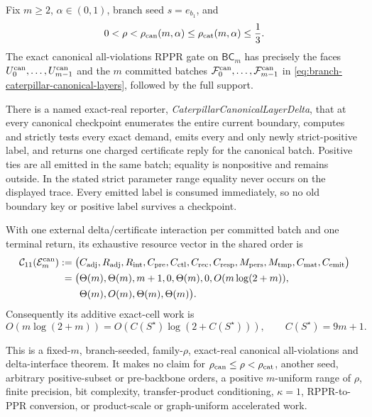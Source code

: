 \begin{theorem}
\label{thm:branch-caterpillar-canonical-layer-reporter}
Fix $m\geq2$, $\alpha\in(0,1)$, branch seed $s=e_{b_1}$, and
\begin{equation*}
 0<\rho<\rho_{\rm can}(m,\alpha)
 \leq\rho_{\rm cat}(m,\alpha)\leq\frac13.
\end{equation*}
The exact canonical all-violations RPPR gate on $\mathsf{BC}_m$ has precisely
the faces $U_0^{\rm can},\ldots,U_{m-1}^{\rm can}$ and the $m$ committed
batches $\mathcal F_0^{\rm can},\ldots,\mathcal F_{m-1}^{\rm can}$ in
\eqref{eq:branch-caterpillar-canonical-layers}, followed by the full support.

There is a named exact-real reporter,
\emph{CaterpillarCanonicalLayerDelta}, that at every canonical checkpoint
enumerates the entire current boundary, computes and strictly tests every
exact demand, emits every and only newly strict-positive label, and returns
one charged certificate reply for the canonical batch.  Positive ties are
all emitted in the same batch; equality is nonpositive and remains outside.
In the stated strict parameter range equality never occurs on the displayed
trace.  Every emitted label is consumed immediately, so no old boundary key
or positive label survives a checkpoint.

With one external delta/certificate interaction per committed batch and one
terminal return, its exhaustive resource vector in the shared order is
\begin{equation}
 \begin{aligned}
 \mathcal C_{11}(\mathcal E_m^{\rm can})
 :=\bigl(&C_{\rm adj},R_{\rm adj},R_{\rm int},C_{\rm pre},C_{\rm ctl},
 C_{\rm rec},C_{\rm resp},M_{\rm pers},M_{\rm tmp},C_{\rm mat},C_{\rm emit}
 \bigr)\\
 =\bigl(&\Theta(m),\Theta(m),m+1,0,\Theta(m),0,
 O(m\log(2+m)),\\
 &\Theta(m),O(m),\Theta(m),\Theta(m)\bigr).
 \end{aligned}
 \label{eq:branch-caterpillar-canonical-eleven-vector}
\end{equation}
Consequently its additive exact-cell work is
\begin{equation}
 O(m\log(2+m))
 =O\!\left(C(S^\star)\log(2+C(S^\star))\right),
 \qquad C(S^\star)=9m+1.
 \label{eq:branch-caterpillar-canonical-total}
\end{equation}

This is a fixed-$m$, branch-seeded, family-$\rho$, exact-real canonical
all-violations and delta-interface theorem.  It makes no claim for
$\rho_{\rm can}\leq\rho<\rho_{\rm cat}$, another seed, arbitrary
positive-subset or pre-backbone orders, a positive $m$-uniform range of
$\rho$, finite precision, bit complexity, transfer-product conditioning,
$\kappa=1$, RPPR-to-PPR conversion, or product-scale or graph-uniform
accelerated work.
\end{theorem}

